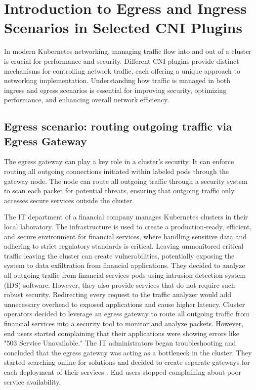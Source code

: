 \chapter{Introduction to Egress and Ingress Scenarios in Selected CNI Plugins}
\label{cha:introScenarios}
In modern Kubernetes networking, managing traffic flow into and out of a cluster is crucial for performance and security. Different CNI plugins provide distinct mechanisms for controlling network traffic, each offering a unique approach to networking implementation. Understanding how traffic is managed in both ingress and egress scenarios is essential for improving security, optimizing performance, and enhancing overall network efficiency.

\section{Egress scenario: routing outgoing traffic via Egress Gateway}
\label{sec:egress}

The egress gateway can play a key role in a cluster's security. It can enforce routing all outgoing connections initiated within labeled pods through the gateway node. The node can route all outgoing traffic through a security system to scan each packet for potential threats, ensuring that outgoing traffic only accesses secure services outside the cluster.

The IT department of a financial company manages Kubernetes clusters in their local laboratory. The infrastructure is used to create a production-ready, efficient, and secure environment for financial services, where handling sensitive data and adhering to strict regulatory standards is critical. Leaving unmonitored critical traffic leaving the cluster can create vulnerabilities, potentially exposing the system to data exfiltration from financial applications. They decided to analyze all outgoing traffic from financial services pods using intrusion detection system (IDS) software. However, they also provide services that do not require such robust security. Redirecting every request to the traffic analyzer would add unnecessary overhead to exposed applications and cause higher latency. Cluster operators decided to leverage an egress gateway to route all outgoing traffic from financial services into a security tool to monitor and analyze packets. However, end users started complaining that their applications were showing errors like "503 Service Unavailable." The IT administrators began troubleshooting and concluded that the egress gateway was acting as a bottleneck in the cluster. They started searching online for solutions and decided to create separate gateways for each deployment of their services \cite{CalicoEgressDeploy}. End users stopped complaining about poor service availability.

